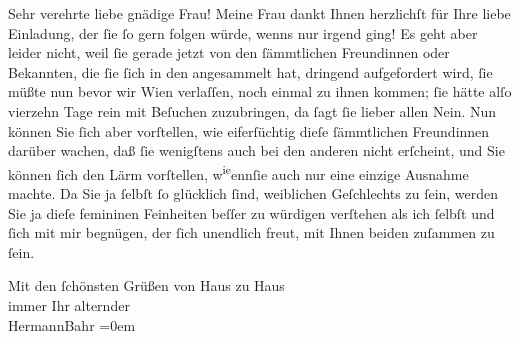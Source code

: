 \pstart\center{}Sehr verehrte liebe gnädige Frau!\pend\vspace{0.5em}
\pstart
           Meine Frau dankt Ihnen
               herzlichſt für Ihre liebe Einladung, der{ }ſie{ }ſo gern folgen würde, wenns nur irgend
               ging! Es geht aber leider nicht, weil{ }ſie gerade jetzt von den{ }ſämmtlichen
               Freundinnen oder Bekannten, die{ }ſie{ }ſich in den \label{K_L02060-1v}\label{K_L02060-1} angesammelt hat, dringend
               aufgefordert wird,{ }ſie müßte nun bevor wir Wien
               verlaſſen, noch einmal zu ihnen kommen;{ }ſie hätte alſo vierzehn Tage rein mit
               Beſuchen zuzubringen, da{ }ſagt{ }ſie lieber allen Nein. Nun können Sie{ }ſich aber
               vorſtellen, wie eiferſüchtig {\pb}dieſe{ }ſämmtlichen
               Freundinnen darüber wachen, daß{ }ſie wenigſtens auch bei den anderen nicht erſcheint,
               und Sie können{ }ſich den Lärm vorſtellen, w\substVorne{}\textsuperscript{ie}\substDazwischen{}enn\substHinten{}{ }ſie auch nur eine einzige
               Ausnahme machte. Da Sie ja{ }ſelbſt{ }ſo glücklich{ }ſind, weiblichen Geſchlechts zu{ }ſein,
               werden Sie ja dieſe femininen Feinheiten beſſer zu würdigen verſtehen als ich{ }ſelbſt
               und{ }ſich \label{K_L02060-11v}\label{K_L02060-11} mit mir begnügen, der{ }ſich unendlich freut, mit
               Ihnen beiden zuſammen zu{ }ſein.\pend
           
\pstart
           Mit den{ }ſchönsten Grüßen von Haus zu Haus{\\[\baselineskip]}immer Ihr alternder{\\[\baselineskip]}\spacefill\mbox{HermannBahr}\pend
           \leftskip=0em{}\endnumbering{}  \newcommand{\dateiname}{L02060}\newcommand{\titel}{Hermann Bahr an Olga Schnitzler, 27. 4. 1912}\newcommand{\editorInnen}{Martin Anton Müller und Kurt Ifkovits}
